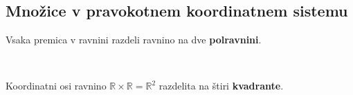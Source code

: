     
                ~~\\~\\~



                \newpage
    
        \subsection*{Množice v pravokotnem koordinatnem sistemu}


            Vsaka premica v ravnini razdeli ravnino na dve \textbf{polravnini}.
            
            ~

            
            Koordinatni osi ravnino $\mathbb{R}\times\mathbb{R}=\mathbb{R}^2$ razdelita na štiri \textbf{kvadrante}.

